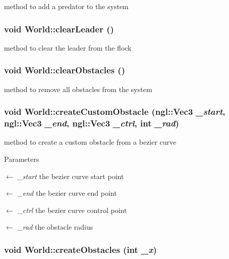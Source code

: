 method to add a predator to the system \hypertarget{classWorld_a3da235a0341b5a0b614f2321c689f3ad}{
\subsubsection[{clearLeader}]{\setlength{\rightskip}{0pt plus 5cm}void World::clearLeader ()}}
\label{classWorld_a3da235a0341b5a0b614f2321c689f3ad}


method to clear the leader from the flock \hypertarget{classWorld_aa1f1e0468ad1490b2e4fa72852ac1eac}{
\subsubsection[{clearObstacles}]{\setlength{\rightskip}{0pt plus 5cm}void World::clearObstacles ()}}
\label{classWorld_aa1f1e0468ad1490b2e4fa72852ac1eac}


method to remove all obstacles from the system \hypertarget{classWorld_a39304ac5c19557a9bea6be92c2f643d2}{
\subsubsection[{createCustomObstacle}]{\setlength{\rightskip}{0pt plus 5cm}void World::createCustomObstacle (ngl::Vec3 {\em \_\-start}, \/  ngl::Vec3 {\em \_\-end}, \/  ngl::Vec3 {\em \_\-ctrl}, \/  int {\em \_\-rad})}}
\label{classWorld_a39304ac5c19557a9bea6be92c2f643d2}


method to create a custom obstacle from a bezier curve 
\begin{DoxyParams}{Parameters}
\item[\mbox{$\leftarrow$} {\em \_\-start}]the bezier curve start point \item[\mbox{$\leftarrow$} {\em \_\-end}]the bezier curve end point \item[\mbox{$\leftarrow$} {\em \_\-ctrl}]the bezier curve control point \item[\mbox{$\leftarrow$} {\em \_\-rad}]the obstacle radius \end{DoxyParams}
\hypertarget{classWorld_ac875e2437e2493c3f5c5ca7c0a2949ae}{
\subsubsection[{createObstacles}]{\setlength{\rightskip}{0pt plus 5cm}void World::createObstacles (int {\em \_\-x})}}
\label{classWorld_ac875e2437e2493c3f5c5ca7c0a2949ae}


